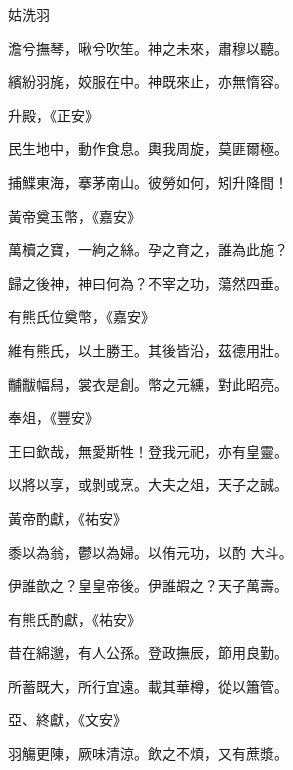 \begin{pinyinscope}
 姑洗羽



 澹兮撫琴，啾兮吹笙。神之未來，肅穆以聽。



 繽紛羽旄，姣服在中。神既來止，亦無惰容。



 升殿，《正安》



 民生地中，動作食息。輿我周旋，莫匪爾極。



 捕鰈東海，搴茅南山。彼勞如何，矧升降間！



 黃帝奠玉幣，《嘉安》



 萬櫝之寶，一絇之絲。孕之育之，誰為此施？



 歸之後神，神曰何為？不宰之功，蕩然四垂。



 有熊氏位奠幣，《嘉安》



 維有熊氏，以土勝王。其後皆沿，茲德用壯。



 黼黻幅舄，裳衣是創。幣之元纁，對此昭亮。



 奉俎，《豐安》



 王曰欽哉，無愛斯牲！登我元祀，亦有皇靈。



 以將以享，或剝或烹。大夫之俎，天子之誠。



 黃帝酌獻，《祐安》



 黍以為翁，鬱以為婦。以侑元功，以酌
 大斗。



 伊誰歆之？皇皇帝後。伊誰嘏之？天子萬壽。



 有熊氏酌獻，《祐安》



 昔在綿邈，有人公孫。登政撫辰，節用良勤。



 所蓄既大，所行宜遠。載其華樽，從以簫管。



 亞、終獻，《文安》



 羽觴更陳，厥味清涼。飲之不煩，又有蔗漿。




\end{pinyinscope}
